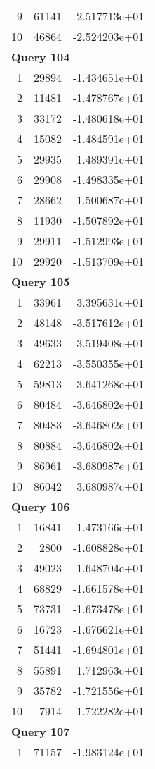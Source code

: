 \begin{longtable}[{p}]{@{}rrp{}@{}}
9 & 61141 & -2.517713e+01 \\
10 & 46864 & -2.524203e+01 \\
\midrule
\multicolumn{3}{l}{\bfseries Query 104} \\
1 & 29894 & -1.434651e+01 \\
2 & 11481 & -1.478767e+01 \\
3 & 33172 & -1.480618e+01 \\
4 & 15082 & -1.484591e+01 \\
5 & 29935 & -1.489391e+01 \\
6 & 29908 & -1.498335e+01 \\
7 & 28662 & -1.500687e+01 \\
8 & 11930 & -1.507892e+01 \\
9 & 29911 & -1.512993e+01 \\
10 & 29920 & -1.513709e+01 \\
\midrule
\multicolumn{3}{l}{\bfseries Query 105} \\
1 & 33961 & -3.395631e+01 \\
2 & 48148 & -3.517612e+01 \\
3 & 49633 & -3.519408e+01 \\
4 & 62213 & -3.550355e+01 \\
5 & 59813 & -3.641268e+01 \\
6 & 80484 & -3.646802e+01 \\
7 & 80483 & -3.646802e+01 \\
8 & 80884 & -3.646802e+01 \\
9 & 86961 & -3.680987e+01 \\
10 & 86042 & -3.680987e+01 \\
\midrule
\multicolumn{3}{l}{\bfseries Query 106} \\
1 & 16841 & -1.473166e+01 \\
2 & 2800 & -1.608828e+01 \\
3 & 49023 & -1.648704e+01 \\
4 & 68829 & -1.661578e+01 \\
5 & 73731 & -1.673478e+01 \\
6 & 16723 & -1.676621e+01 \\
7 & 51441 & -1.694801e+01 \\
8 & 55891 & -1.712963e+01 \\
9 & 35782 & -1.721556e+01 \\
10 & 7914 & -1.722282e+01 \\
\midrule
\multicolumn{3}{l}{\bfseries Query 107} \\
1 & 71157 & -1.983124e+01 \\

\end{longtable}
